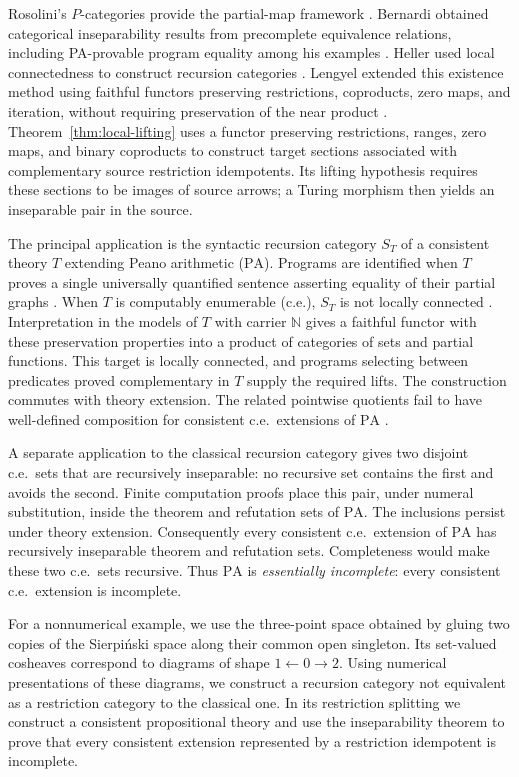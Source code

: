 \documentclass[11pt]{article}
\newcommand{\N}{\mathbb N}
\newcommand{\PA}{\mathrm{PA}}
\begin{document}
Rosolini's $P$-categories provide the partial-map framework
\cite{RosoliniThesis,Rosolini}. Bernardi obtained categorical
inseparability results from precomplete equivalence relations, including
PA-provable program equality among his examples
\cite[pp.~125--128]{Bernardi}. Heller used local connectedness to
construct recursion categories \cite[Sections 8--9]{Heller}.
Lengyel extended this existence method using faithful functors
preserving restrictions, coproducts, zero maps, and iteration, without
requiring preservation of the near product \cite{Lengyel2004,Corrections}.
Theorem~\ref{thm:local-lifting}
uses a functor preserving restrictions, ranges, zero maps, and binary
coproducts to construct target sections associated with complementary
source restriction idempotents. Its lifting hypothesis
requires these sections to be images of source arrows; a Turing
morphism then yields an inseparable pair in the source.

The principal application is the syntactic recursion category $S_T$ of
a consistent theory $T$ extending Peano arithmetic ($\PA$). Programs
are identified when $T$ proves a single universally quantified sentence
asserting equality of their partial graphs \cite{Montagna,DPM}.
When $T$ is computably enumerable (c.e.), $S_T$ is not locally connected
\cite[Corollary 4.4]{DPM}. Interpretation in the models of $T$ with
carrier $\N$ gives a faithful functor with these preservation properties
into a product of categories of sets and partial functions. This target
is locally connected, and
programs selecting between predicates proved complementary in $T$
supply the required lifts. The construction commutes with theory
extension. The related pointwise quotients fail to have well-defined
composition for consistent c.e.\ extensions of $\PA$
\cite[Corollary 2]{Composition}.

A separate application to the classical recursion category gives two
disjoint c.e.\ sets that are recursively inseparable: no recursive set
contains the first and avoids the second. Finite computation proofs
place this pair, under numeral substitution, inside the theorem and
refutation sets of $\PA$. The inclusions persist under theory extension.
Consequently every consistent c.e.\ extension of $\PA$ has recursively
inseparable theorem and refutation sets. Completeness would make these
two c.e.\ sets recursive. Thus $\PA$ is \emph{essentially incomplete}:
every consistent c.e.\ extension is incomplete.

For a nonnumerical example, we use the three-point space obtained by
gluing two copies of the Sierpi\'nski space along their common open
singleton. Its set-valued cosheaves correspond to diagrams of shape
$1\leftarrow0\to2$. Using numerical presentations of these diagrams,
we construct a recursion category not equivalent as a restriction
category to the classical one. In its restriction splitting we construct
a consistent propositional theory and use the inseparability theorem
to prove that every consistent extension represented by a restriction
idempotent is incomplete.
\end{document}
